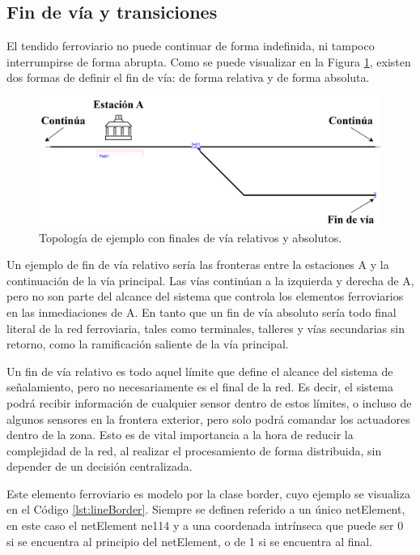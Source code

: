 \subsection{Fin de vía y transiciones}
    \label{sec:bufferstop}

    El tendido ferroviario no puede continuar de forma indefinida, ni tampoco interrumpirse de forma abrupta. Como se puede visualizar en la Figura \ref{fig:frontera_1}, existen dos formas de definir el fin de vía: de forma relativa y de forma absoluta.

    \begin{figure}[H]
        \centering
        \includegraphics[width=1\textwidth]{Figuras/border}
        \centering\caption{Topología de ejemplo con finales de vía relativos y absolutos.}
        \label{fig:frontera_1}
    \end{figure}

    Un ejemplo de fin de vía relativo sería las fronteras entre la estaciones A y la continuación de la vía principal. Las vías continúan a la izquierda y derecha de A, pero no son parte del alcance del sistema que controla los elementos ferroviarios en las inmediaciones de A. En tanto que un fin de vía absoluto sería todo final literal de la red ferroviaria, tales como terminales, talleres y vías secundarias sin retorno, como la ramificación saliente de la vía principal.
    
    Un fin de vía relativo es todo aquel límite que define el alcance del sistema de señalamiento, pero no necesariamente es el final de la red. Es decir, el sistema podrá recibir información de cualquier sensor dentro de estos límites, o incluso de algunos sensores en la frontera exterior, pero solo podrá comandar los actuadores dentro de la zona. Esto es de vital importancia a la hora de reducir la complejidad de la red, al realizar el procesamiento de forma distribuida, sin depender de un decisión centralizada.

    Este elemento ferroviario es modelo por la clase border, cuyo ejemplo se visualiza en el Código \ref{lst:lineBorder}. Siempre se definen referido a un único netElement, en este caso el netElement ne114 y a una coordenada intrínseca que puede ser 0 si se encuentra al principio del netElement, o de 1 si se encuentra al final.

